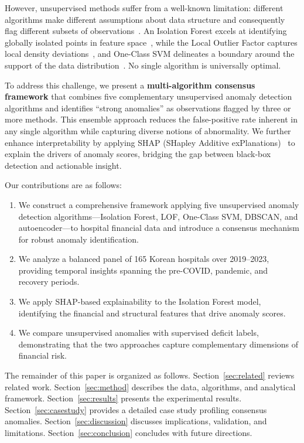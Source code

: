 \documentclass{ieeeaccess}
\begin{document}
However, unsupervised methods suffer from a well-known limitation: different algorithms make different assumptions about data structure and consequently flag different subsets of observations~\cite{goldstein2016comparative, domingues2018comparative}. An Isolation Forest excels at identifying globally isolated points in feature space~\cite{liu2008isolation}, while the Local Outlier Factor captures local density deviations~\cite{breunig2000lof}, and One-Class SVM delineates a boundary around the support of the data distribution~\cite{scholkopf2001estimating}. No single algorithm is universally optimal.

To address this challenge, we present a \textbf{multi-algorithm consensus framework} that combines five complementary unsupervised anomaly detection algorithms and identifies ``strong anomalies'' as observations flagged by three or more methods. This ensemble approach reduces the false-positive rate inherent in any single algorithm while capturing diverse notions of abnormality. We further enhance interpretability by applying SHAP (SHapley Additive exPlanations)~\cite{lundberg2017unified} to explain the drivers of anomaly scores, bridging the gap between black-box detection and actionable insight.

Our contributions are as follows:
\begin{enumerate}
    \item We construct a comprehensive framework applying five unsupervised anomaly detection algorithms---Isolation Forest, LOF, One-Class SVM, DBSCAN, and autoencoder---to hospital financial data and introduce a consensus mechanism for robust anomaly identification.
    \item We analyze a balanced panel of 165 Korean hospitals over 2019--2023, providing temporal insights spanning the pre-COVID, pandemic, and recovery periods.
    \item We apply SHAP-based explainability to the Isolation Forest model, identifying the financial and structural features that drive anomaly scores.
    \item We compare unsupervised anomalies with supervised deficit labels, demonstrating that the two approaches capture complementary dimensions of financial risk.
\end{enumerate}

The remainder of this paper is organized as follows. Section~\ref{sec:related} reviews related work. Section~\ref{sec:method} describes the data, algorithms, and analytical framework. Section~\ref{sec:results} presents the experimental results. Section~\ref{sec:casestudy} provides a detailed case study profiling consensus anomalies. Section~\ref{sec:discussion} discusses implications, validation, and limitations. Section~\ref{sec:conclusion} concludes with future directions.
\end{document}
